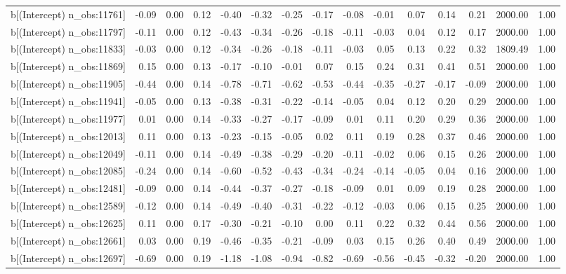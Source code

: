 \begin{table}[ht]
\begin{tabular}{rrrrrrrrrrrrrrr}
  b[(Intercept) n\_obs:11761] & -0.09 & 0.00 & 0.12 & -0.40 & -0.32 & -0.25 & -0.17 & -0.08 & -0.01 & 0.07 & 0.14 & 0.21 & 2000.00 & 1.00 \\ 
  b[(Intercept) n\_obs:11797] & -0.11 & 0.00 & 0.12 & -0.43 & -0.34 & -0.26 & -0.18 & -0.11 & -0.03 & 0.04 & 0.12 & 0.17 & 2000.00 & 1.00 \\ 
  b[(Intercept) n\_obs:11833] & -0.03 & 0.00 & 0.12 & -0.34 & -0.26 & -0.18 & -0.11 & -0.03 & 0.05 & 0.13 & 0.22 & 0.32 & 1809.49 & 1.00 \\ 
  b[(Intercept) n\_obs:11869] & 0.15 & 0.00 & 0.13 & -0.17 & -0.10 & -0.01 & 0.07 & 0.15 & 0.24 & 0.31 & 0.41 & 0.51 & 2000.00 & 1.00 \\ 
  b[(Intercept) n\_obs:11905] & -0.44 & 0.00 & 0.14 & -0.78 & -0.71 & -0.62 & -0.53 & -0.44 & -0.35 & -0.27 & -0.17 & -0.09 & 2000.00 & 1.00 \\ 
  b[(Intercept) n\_obs:11941] & -0.05 & 0.00 & 0.13 & -0.38 & -0.31 & -0.22 & -0.14 & -0.05 & 0.04 & 0.12 & 0.20 & 0.29 & 2000.00 & 1.00 \\ 
  b[(Intercept) n\_obs:11977] & 0.01 & 0.00 & 0.14 & -0.33 & -0.27 & -0.17 & -0.09 & 0.01 & 0.11 & 0.20 & 0.29 & 0.36 & 2000.00 & 1.00 \\ 
  b[(Intercept) n\_obs:12013] & 0.11 & 0.00 & 0.13 & -0.23 & -0.15 & -0.05 & 0.02 & 0.11 & 0.19 & 0.28 & 0.37 & 0.46 & 2000.00 & 1.00 \\ 
  b[(Intercept) n\_obs:12049] & -0.11 & 0.00 & 0.14 & -0.49 & -0.38 & -0.29 & -0.20 & -0.11 & -0.02 & 0.06 & 0.15 & 0.26 & 2000.00 & 1.00 \\ 
  b[(Intercept) n\_obs:12085] & -0.24 & 0.00 & 0.14 & -0.60 & -0.52 & -0.43 & -0.34 & -0.24 & -0.14 & -0.05 & 0.04 & 0.16 & 2000.00 & 1.00 \\ 
  b[(Intercept) n\_obs:12481] & -0.09 & 0.00 & 0.14 & -0.44 & -0.37 & -0.27 & -0.18 & -0.09 & 0.01 & 0.09 & 0.19 & 0.28 & 2000.00 & 1.00 \\ 
  b[(Intercept) n\_obs:12589] & -0.12 & 0.00 & 0.14 & -0.49 & -0.40 & -0.31 & -0.22 & -0.12 & -0.03 & 0.06 & 0.15 & 0.25 & 2000.00 & 1.00 \\ 
  b[(Intercept) n\_obs:12625] & 0.11 & 0.00 & 0.17 & -0.30 & -0.21 & -0.10 & 0.00 & 0.11 & 0.22 & 0.32 & 0.44 & 0.56 & 2000.00 & 1.00 \\ 
  b[(Intercept) n\_obs:12661] & 0.03 & 0.00 & 0.19 & -0.46 & -0.35 & -0.21 & -0.09 & 0.03 & 0.15 & 0.26 & 0.40 & 0.49 & 2000.00 & 1.00 \\ 
  b[(Intercept) n\_obs:12697] & -0.69 & 0.00 & 0.19 & -1.18 & -1.08 & -0.94 & -0.82 & -0.69 & -0.56 & -0.45 & -0.32 & -0.20 & 2000.00 & 1.00 \\ 

\end{tabular}
\end{table}
